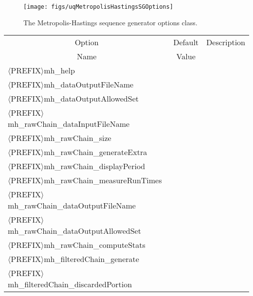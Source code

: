 \begin{figure}[h!]
\begin{center}
\texttt{[image: figs/uqMetropolisHastingsSGOptions]}
\end{center}
\caption{
The Metropolis-Hastings sequence generator options class.
}
\label{fig-metropolis-hastings-options-class}
\end{figure}

\begin{table}[!h]
\begin{center}
\begin{tabular}{|l|c|c|}
\hline
\multicolumn{1}{|c|}{Option}                                    & Default & Description \\
\multicolumn{1}{|c|}{Name}                                      & Value   &             \\
\hline
\hline
$\langle$PREFIX$\rangle$mh\_help                                &         &             \\
\hline
$\langle$PREFIX$\rangle$mh\_dataOutputFileName                  &         &             \\
\hline
$\langle$PREFIX$\rangle$mh\_dataOutputAllowedSet                &         &             \\
\hline
$\langle$PREFIX$\rangle$mh\_rawChain\_dataInputFileName         &         &             \\
\hline
$\langle$PREFIX$\rangle$mh\_rawChain\_size                      &         &             \\
\hline
$\langle$PREFIX$\rangle$mh\_rawChain\_generateExtra             &         &             \\
\hline
$\langle$PREFIX$\rangle$mh\_rawChain\_displayPeriod             &         &             \\
\hline
$\langle$PREFIX$\rangle$mh\_rawChain\_measureRunTimes           &         &             \\
\hline
$\langle$PREFIX$\rangle$mh\_rawChain\_dataOutputFileName        &         &             \\
\hline
$\langle$PREFIX$\rangle$mh\_rawChain\_dataOutputAllowedSet      &         &             \\
\hline
$\langle$PREFIX$\rangle$mh\_rawChain\_computeStats              &         &             \\
\hline
$\langle$PREFIX$\rangle$mh\_filteredChain\_generate             &         &             \\
\hline
$\langle$PREFIX$\rangle$mh\_filteredChain\_discardedPortion     &         &             \\

\end{tabular}
\end{center}
\end{table}
